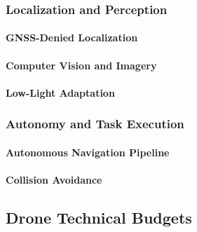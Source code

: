 \subsubsection{Localization and Perception}
\label{subsubsec:localization_perception}

\paragraph{GNSS-Denied Localization}
\label{par:gnss_denied_localization}


\paragraph{Computer Vision and Imagery}
\label{par:computer_vision_imagery}


\paragraph{Low-Light Adaptation}
\label{par:drone_low_light_adaptation}


\subsubsection{Autonomy and Task Execution}
\label{subsubsec:autonomy_task_execution}

\paragraph{Autonomous Navigation Pipeline}
\label{par:autonomous_navigation_pipeline}


\paragraph{Collision Avoidance}
\label{par:drone_collision_avoidance}


\subsection{Drone Technical Budgets}
\label{subsec:drone_technical_budgets}

